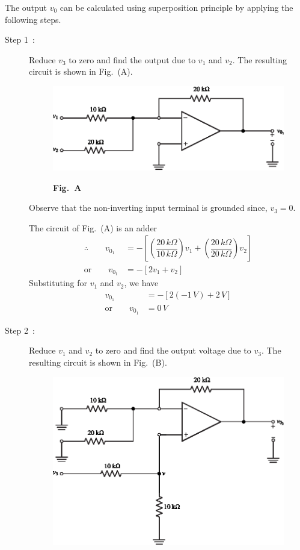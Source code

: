\begin{solution}
The output $v_{0}$ can be calculated using superposition principle by applying the following steps.
\begin{description}
\item[Step 1~:] Reduce $v_{3}$ to zero and find the output due to $v_{1}$ and $v_{2}$. The resulting circuit is shown in Fig.~(A).
\begin{figure}[H]
\centering
\includegraphics{chap4/sol4.29a.eps}

\medskip
{\bf Fig.~A}
\end{figure}
\noindent
Observe that the non-inverting input terminal is grounded since, $v_{3}=0$.

\eject

The circuit of Fig.~(A) is an adder
\begin{align*}
\therefore\qquad v_{0_{1}} &= -\left[\left(\dfrac{20\,k\Omega}{10\,k\Omega}\right)v_{1}+\left(\dfrac{20\,k\Omega}{20\,k\Omega}\right)v_{2}\right]\\[5pt]
\text{or}\qquad v_{0_{1}} &= -[2v_{1}+v_{2}]\tag{A}
\end{align*}
Substituting for $v_{1}$ and $v_{2}$, we have
\begin{align*}
v_{0_{1}} &= -[2(-1\,V)+2\,V]\\[4pt]
\text{or}\qquad v_{0_{1}} &= 0\,V\tag{B}
\end{align*}

\item[Step 2~:] Reduce $v_{1}$ and $v_{2}$ to zero and find the output voltage due to $v_{3}$. The resulting circuit is shown in Fig.~(B).
\begin{figure}[H]
\centering
\includegraphics{chap4/sol4.29b.eps}


\end{figure}
\end{description}
\end{solution}
